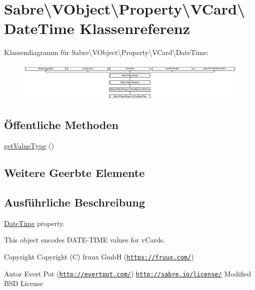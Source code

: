 \hypertarget{class_sabre_1_1_v_object_1_1_property_1_1_v_card_1_1_date_time}{}\section{Sabre\textbackslash{}V\+Object\textbackslash{}Property\textbackslash{}V\+Card\textbackslash{}Date\+Time Klassenreferenz}
\label{class_sabre_1_1_v_object_1_1_property_1_1_v_card_1_1_date_time}
Klassendiagramm für Sabre\textbackslash{}V\+Object\textbackslash{}Property\textbackslash{}V\+Card\textbackslash{}Date\+Time\+:\begin{figure}[H]
\begin{center}
\leavevmode
\includegraphics[height=1.917808cm]{class_sabre_1_1_v_object_1_1_property_1_1_v_card_1_1_date_time}
\end{center}
\end{figure}
\subsection*{Öffentliche Methoden}
\begin{DoxyCompactItemize}
\item 
\mbox{\hyperlink{class_sabre_1_1_v_object_1_1_property_1_1_v_card_1_1_date_time_a7da3789a731e69e6ce51712668f0d900}{get\+Value\+Type}} ()
\end{DoxyCompactItemize}
\subsection*{Weitere Geerbte Elemente}


\subsection{Ausführliche Beschreibung}
\mbox{\hyperlink{class_sabre_1_1_v_object_1_1_property_1_1_v_card_1_1_date_time}{Date\+Time}} property.

This object encodes D\+A\+T\+E-\/\+T\+I\+ME values for v\+Cards.

\begin{DoxyCopyright}{Copyright}
Copyright (C) fruux GmbH (\href{https://fruux.com/}{\tt https\+://fruux.\+com/}) 
\end{DoxyCopyright}
\begin{DoxyAuthor}{Autor}
Evert Pot (\href{http://evertpot.com/}{\tt http\+://evertpot.\+com/})  \href{http://sabre.io/license/}{\tt http\+://sabre.\+io/license/} Modified B\+SD License 
\end{DoxyAuthor}


